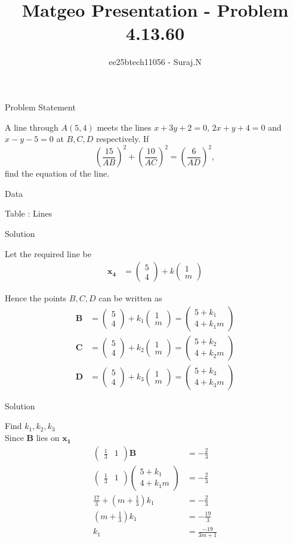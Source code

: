 \documentclass{beamer}
\title{Matgeo Presentation - Problem 4.13.60}
\author{ee25btech11056 - Suraj.N}
\numberwithin{equation}{section}
\providecommand{\brak}[1]{\ensuremath{\left(#1\right)}}
\theoremstyle{remark}
\newcommand{\myvec}[1]{\ensuremath{\begin{pmatrix}#1\end{pmatrix}}}
\let\vec\mathbf
\begin{document}
\begin{frame}
  \titlepage
\end{frame}

\begin{frame}{Problem Statement}

A line through $A(5,4)$ meets the lines 
$x+3y+2=0$, $2x+y+4=0$ and $x-y-5=0$ 
at $B,C,D$ respectively. If 
\[
\left(\frac{15}{AB}\right)^2 + \left(\frac{10}{AC}\right)^2 = \left(\frac{6}{AD}\right)^2,
\]
find the equation of the line.

\end{frame}

\begin{frame}{Data}

\begin{table}[h!]
  \centering
  
  \caption*{Table : Lines}
  \label{4.13.60}
\end{table}

\end{frame}

\begin{frame}{Solution}

Let the required line be
\begin{align}
\vec{x_4} &= \myvec{5\\4} + k\myvec{1\\m}
\end{align}

Hence the points $B,C,D$ can be written as
\begin{align}
\vec{B} &= \myvec{5\\4} + k_1\myvec{1\\m} = \myvec{5+k_1\\4+k_1m}  \\
\vec{C} &= \myvec{5\\4} + k_2\myvec{1\\m} = \myvec{5+k_2\\4+k_2m} \\
\vec{D} &= \myvec{5\\4} + k_3\myvec{1\\m} = \myvec{5+k_3\\4+k_3m} 
\end{align}

\end{frame}

\begin{frame}{Solution}

Find $k_1,k_2,k_3$\\
Since $\vec{B}$ lies on $\vec{x_1}$
\begin{align}
\myvec{\tfrac{1}{3} & 1}\vec{B} &= -\tfrac{2}{3}\\
\myvec{\tfrac{1}{3} & 1}\myvec{5+k_1\\4+k_1m} &= -\tfrac{2}{3}\\
\frac{17}{3}+\brak{m+\tfrac{1}{3}}k_1 &= -\tfrac{2}{3} \\
\brak{m+\tfrac{1}{3}}k_1 &= -\tfrac{19}{3} \\
k_1 &= \frac{-19}{3m+1}
\end{align}

\end{frame}
\end{document}
